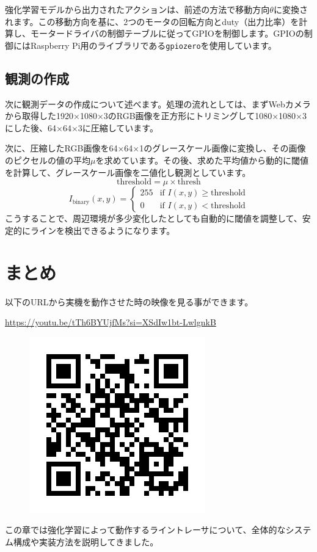 強化学習モデルから出力されたアクションは、前述の方法で移動方向$\theta$に変換されます。この移動方向を基に、2つのモータの回転方向とduty（出力比率）を計算し、モータードライバの制御テーブルに従ってGPIOを制御します。GPIOの制御にはRaspberry Pi用のライブラリである\texttt{gpiozero}を使用しています。

\subsection{観測の作成}
次に観測データの作成について述べます。処理の流れとしては、まずWebカメラから取得した1920×1080×3のRGB画像を正方形にトリミングして1080×1080×3にした後、64×64×3に圧縮しています。

次に、圧縮したRGB画像を64×64×1のグレースケール画像に変換し、その画像のピクセルの値の平均$\mu$を求めています。その後、求めた平均値から動的に閾値を計算して、グレースケール画像を二値化し観測としています。
\[
\text{threshold} = \mu \times \text{thresh}
\]
\[
I_{\text{binary}}(x, y) =
\begin{cases}
255 & \text{if } I(x, y) \geq \text{threshold} \\
0 & \text{if } I(x, y) < \text{threshold}
\end{cases}
\]
こうすることで、周辺環境が多少変化したとしても自動的に閾値を調整して、安定的にラインを検出できるようになります。

\section{まとめ}
以下のURLから実機を動作させた時の映像を見る事ができます。

\url{https://youtu.be/tTh6BYUjfMs?si=XSdIw1bt-LwlgnkB}
\begin{figure}[h]
  \includegraphics[width=0.4\hsize]{line-tracer/fig/QR.png}
\end{figure}

この章では強化学習によって動作するライントレーサについて、全体的なシステム構成や実装方法を説明してきました。

